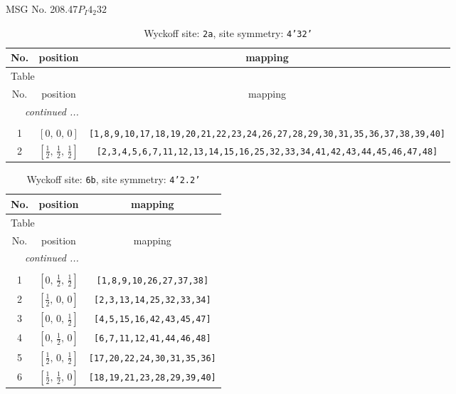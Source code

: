 \documentclass[fleqn,8pt]{jsarticle}
\begin{document}
\setcounter{MaxMatrixCols}{32}

\renewcommand{\tablename}{Table~}
\renewcommand{\figurename}{Figure~}
\begin{center}
\LARGE
MSG No. 208.47\quad$P_{I}4_{2}32$
\end{center}
\renewcommand{\arraystretch}{1.2}
\begin{longtable}{ccc}
\caption{Wyckoff site: {\tt 2a}, site symmetry: {\tt 4'32'}}
 \\
 \hline \hline
No. & position & mapping \\ \hline \endfirsthead

\multicolumn{2}{l}{\tablename\ \thetable{}} \\
 \hline \hline
No. & position & mapping \\ \hline \endhead

 \hline \hline
\multicolumn{2}{r}{\footnotesize\it continued ...} \\ \endfoot

 \hline \hline
\multicolumn{2}{r}{} \\ \endlastfoot

1 & $\left[ 0,\, 0,\, 0 \right]$ & {\tt [1,8,9,10,17,18,19,20,21,22,23,24,26,27,28,29,30,31,35,36,37,38,39,40]} \\ \hline
2 & $\left[ \frac{1}{2},\, \frac{1}{2},\, \frac{1}{2} \right]$ & {\tt [2,3,4,5,6,7,11,12,13,14,15,16,25,32,33,34,41,42,43,44,45,46,47,48]} \\
\end{longtable}
\renewcommand{\arraystretch}{1.2}
\begin{longtable}{ccc}
\caption{Wyckoff site: {\tt 6b}, site symmetry: {\tt 4'2.2'}}
 \\
 \hline \hline
No. & position & mapping \\ \hline \endfirsthead

\multicolumn{2}{l}{\tablename\ \thetable{}} \\
 \hline \hline
No. & position & mapping \\ \hline \endhead

 \hline \hline
\multicolumn{2}{r}{\footnotesize\it continued ...} \\ \endfoot

 \hline \hline
\multicolumn{2}{r}{} \\ \endlastfoot

1 & $\left[ 0,\, \frac{1}{2},\, \frac{1}{2} \right]$ & {\tt [1,8,9,10,26,27,37,38]} \\ \hline
2 & $\left[ \frac{1}{2},\, 0,\, 0 \right]$ & {\tt [2,3,13,14,25,32,33,34]} \\ \hline
3 & $\left[ 0,\, 0,\, \frac{1}{2} \right]$ & {\tt [4,5,15,16,42,43,45,47]} \\ \hline
4 & $\left[ 0,\, \frac{1}{2},\, 0 \right]$ & {\tt [6,7,11,12,41,44,46,48]} \\ \hline
5 & $\left[ \frac{1}{2},\, 0,\, \frac{1}{2} \right]$ & {\tt [17,20,22,24,30,31,35,36]} \\ \hline
6 & $\left[ \frac{1}{2},\, \frac{1}{2},\, 0 \right]$ & {\tt [18,19,21,23,28,29,39,40]} \\
\end{longtable}
\end{document}
